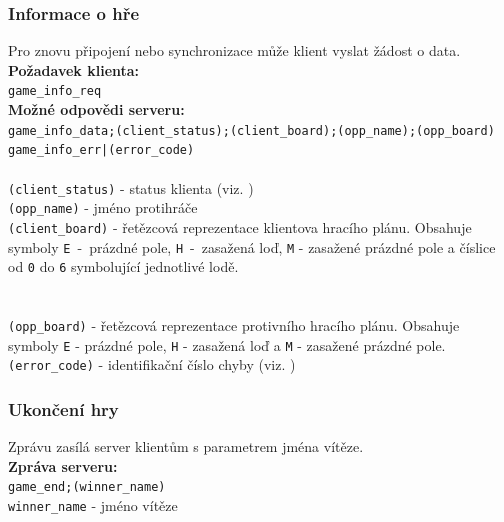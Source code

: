 \documentclass[12pt, a4paper]{article} %
\begin{document}
	\subsubsection{Informace o hře}
	\par Pro znovu připojení nebo synchronizace může klient vyslat žádost o data.\\
	\textbf{Požadavek klienta:}\\
	\texttt{game\_info\_req}\\
	\textbf{Možné odpovědi serveru:}\\
	\texttt{game\_info\_data;(client\_status);(client\_board);(opp\_name);(opp\_board)}\\
	\texttt{game\_info\_err|(error\_code)}\\\\
	\texttt{(client\_status)} - status klienta (viz. )\\
	\texttt{(opp\_name)} - jméno protihráče\\
	\texttt{(client\_board)} - řetězcová reprezentace klientova hracího plánu. Obsahuje symboly \texttt{E} - prázdné pole, \texttt{H} - zasažená loď, \texttt{M} - zasažené prázdné pole a číslice od \texttt{0} do \texttt{6} symbolující jednotlivé lodě.\\\\\\
	\texttt{(opp\_board)} - řetězcová reprezentace protivního hracího plánu. Obsahuje symboly \texttt{E} - prázdné pole, \texttt{H} - zasažená loď a \texttt{M} - zasažené prázdné pole.\\
	\texttt{(error\_code)} - identifikační číslo chyby (viz. )
	
	\subsubsection{Ukončení hry}
	\par Zprávu zasílá server klientům s parametrem jména vítěze.\\
	\textbf{Zpráva serveru:}\\
	\texttt{game\_end;(winner\_name)}\\
	\texttt{winner\_name} - jméno vítěze
\end{document}
